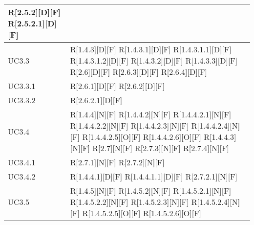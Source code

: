\begin{longtable}{X | X}
R[2.5.2][D][F] \newline
R[2.5.2.1][D][F]  \\
\hline
UC3.3 & R[1.4.3][D][F] \newline
R[1.4.3.1][D][F] \newline
R[1.4.3.1.1][D][F] \newline
R[1.4.3.1.2][D][F] \newline
R[1.4.3.2][D][F] \newline
R[1.4.3.3][D][F] \newline
R[2.6][D][F] \newline
R[2.6.3][D][F] \newline
R[2.6.4][D][F]  \\
\hline
UC3.3.1 & R[2.6.1][D][F] \newline
R[2.6.2][D][F]  \\
\hline
UC3.3.2 & R[2.6.2.1][D][F]  \\
\hline
UC3.4 & R[1.4.4][N][F] \newline
R[1.4.4.2][N][F] \newline
R[1.4.4.2.1][N][F] \newline
R[1.4.4.2.2][N][F] \newline
R[1.4.4.2.3][N][F] \newline
R[1.4.4.2.4][N][F] \newline
R[1.4.4.2.5][O][F] \newline
R[1.4.4.2.6][O][F] \newline
R[1.4.4.3][N][F] \newline
R[2.7][N][F] \newline
R[2.7.3][N][F] \newline
R[2.7.4][N][F]  \\
\hline
UC3.4.1 & R[2.7.1][N][F] \newline
R[2.7.2][N][F]  \\
\hline
UC3.4.2 & R[1.4.4.1][D][F] \newline
R[1.4.4.1.1][D][F] \newline
R[2.7.2.1][N][F]  \\
\hline
UC3.5 & R[1.4.5][N][F] \newline
R[1.4.5.2][N][F] \newline
R[1.4.5.2.1][N][F] \newline
R[1.4.5.2.2][N][F] \newline
R[1.4.5.2.3][N][F] \newline
R[1.4.5.2.4][N][F] \newline
R[1.4.5.2.5][O][F] \newline
R[1.4.5.2.6][O][F] \newline

\end{longtable}
